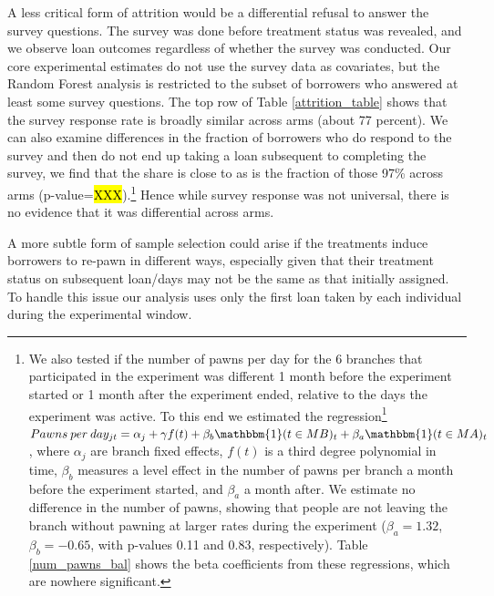 \documentclass[oneside,11pt]{article}
\begin{document}
A less critical form of attrition would be a differential refusal to answer the survey questions.  The survey was done before treatment status was revealed, and we observe loan outcomes regardless of whether the survey was conducted.  Our core experimental estimates do not use the survey data as covariates, but the Random Forest analysis is restricted to the subset of borrowers who answered at least some survey questions. The top row of Table \ref{attrition_table} shows that the survey response rate is broadly similar across arms (about 77 percent). We can also examine differences in the fraction of borrowers who do respond to the survey and then do not end up taking a loan subsequent to completing the survey, we find that the share is close to as is the fraction of those 97\% across arms (p-value=\hl{XXX}).\footnote{We also tested if the number of pawns per day for the 6 branches that participated in the experiment was different 1 month before the experiment started or 1 month after the experiment ended, relative to the days the experiment was active. To this end we estimated the regression\footnote{We cluster the standard errors by branch.} $Pawns \: per \: day_{jt} = \alpha_j + \gamma f(t) + \beta_b \mathbbm{1}(t \in MB)_{t} +\beta_a \mathbbm{1}(t \in MA)_{t}$, where $\alpha_j$ are branch fixed effects, $f(t)$ is a third degree polynomial in time, $\beta_b$ measures a level effect in the number of pawns per branch a month before the experiment started, and $\beta_a$ a month after. We estimate no difference in the number of pawns, showing that people are not leaving the branch without pawning at larger rates during the experiment ($\beta_a=1.32$, $\beta_b=-0.65$, with p-values 0.11 and 0.83, respectively).  Table \ref{num_pawns_bal} shows the beta coefficients from these regressions, which are nowhere significant.}  Hence while survey response was not universal, there is no evidence that it was differential across arms.


A more subtle form of sample selection could arise if the treatments induce borrowers to re-pawn in different ways, especially given that their treatment status on subsequent loan/days may not be the same as that initially assigned.  To handle this issue our analysis uses only the first loan taken by each individual during the experimental window.  
\end{document}
